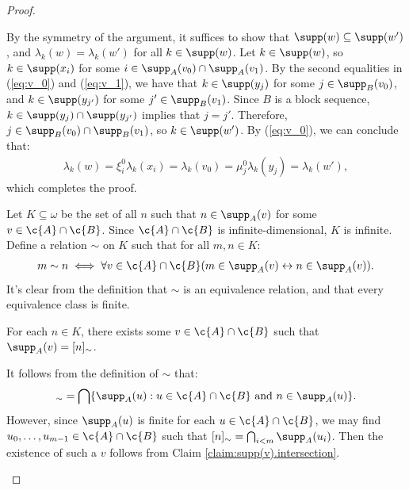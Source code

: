 \documentclass[11pt,reqno]{amsart}
\begin{document}
\begin{proof}
\begin{midproof}
        By the symmetry of the argument, it suffices to show that $\supp(w) \subseteq \supp(w')$, and $\lambda_k(w) = \lambda_k(w')$ for all $k \in \supp(w)$. Let $k \in \supp(w)$, so $k \in \supp(x_i)$ for some $i \in \supp_A(v_0) \cap \supp_A(v_1)$. By the second equalities in (\ref{eq:v_0}) and (\ref{eq:v_1}), we have that $k \in \supp(y_j)$ for some $j \in \supp_B(v_0)$, and $k \in \supp(y_{j'})$ for some $j' \in \supp_B(v_1)$. Since $B$ is a block sequence, $k \in \supp(y_j) \cap \supp(y_{j'})$ implies that $j = j'$. Therefore, $j \in \supp_B(v_0) \cap \supp_B(v_1)$, so $k \in \supp(w')$. By (\ref{eq:v_0}), we can conclude that:
        \begin{align*}
            \lambda_k(w) = \xi_i^0\lambda_k(x_i) = \lambda_k(v_0) = \mu_j^0\lambda_k(y_j) = \lambda_k(w'),
        \end{align*}
        which completes the proof. 
    \end{midproof}
    
    Let $K \subseteq \omega$ be the set of all $n$ such that $n \in \supp_A(v)$ for some $v \in \c{A} \cap \c{B}$. Since $\c{A} \cap \c{B}$ is infinite-dimensional, $K$ is infinite. Define a relation $\sim$ on $K$ such that for all $m,n \in K$:
    \begin{align*}
        m \sim n \iff \forall v \in \c{A} \cap \c{B}(m \in \supp_A(v) \leftrightarrow n \in \supp_A(v)).
    \end{align*}
    It's clear from the definition that $\sim$ is an equivalence relation, and that every equivalence class is finite. 

    \begin{claim}
        For each $n \in K$, there exists some $v \in \c{A} \cap \c{B}$ such that $\supp_A(v) = [n]_\sim$. 
    \end{claim}

    \begin{midproof}
        It follows from the definition of $\sim$ that:
        \begin{align*}
            [n]_\sim = \bigcap\{\supp_A(u) : u \in \c{A} \cap \c{B} \text{ and } n \in \supp_A(u)\}.
        \end{align*}
        However, since $\supp_A(u)$ is finite for each $u \in \c{A} \cap \c{B}$, we may find $u_0,\dots,u_{m-1} \in \c{A} \cap \c{B}$ such that $[n]_\sim = \bigcap_{i<m} \supp_A(u_i)$. Then the existence of such a $v$ follows from Claim \ref{claim:supp(v).intersection}.
    \end{midproof}


\end{proof}
\end{document}
